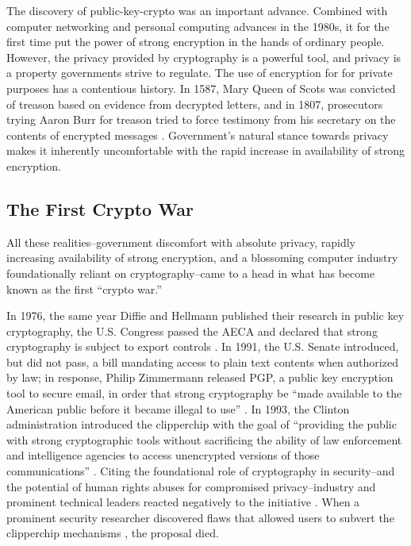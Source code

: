 The discovery of \ac{public-key-crypto} was an important advance. Combined with computer networking and personal
computing advances in the 1980s, it for the first time put the power of strong encryption in the hands of ordinary
people. However, the privacy provided by cryptography is a powerful tool, and privacy is a property governments strive
to regulate. The use of encryption for for private purposes has a contentious history. In 1587, Mary Queen of Scots was
convicted of treason based on evidence from decrypted letters, and in 1807, prosecutors trying Aaron Burr for treason
tried to force testimony from his secretary on the contents of encrypted messages \cite{kerr_encryption_2017}.
Government's natural stance towards privacy makes it inherently uncomfortable with the rapid increase in availability of
strong encryption.


\subsection{The First Crypto War}
\label{sec-history-cw1}

All these realities--government discomfort with absolute privacy, rapidly increasing availability of strong encryption,
and a blossoming computer industry foundationally reliant on cryptography--came to a head in what has become known as
the first ``crypto war.''

In 1976, the same year Diffie and Hellmann published their research in public key cryptography, the U.S. Congress passed
the \ac{AECA} and declared that strong cryptography is subject to export controls \cite{kehl_right_2015}. In 1991, the
U.S. Senate introduced, but did not pass, a bill mandating access to plain text contents when authorized by law; in
response, Philip Zimmermann released \ac{PGP}, a public key encryption tool to secure email, in order that strong
cryptography be ``made available to the American public before it became illegal to use'' \cite{zimmermann_1996}. In
1993, the Clinton administration introduced the \ac{clipperchip} \cite{press_1993} with the goal of ``providing the
public with strong cryptographic tools without sacrificing the ability of law enforcement and intelligence agencies to
access unencrypted versions of those communications'' \cite{thompson_2015}. Citing the foundational role of cryptography
in security--and the potential of human rights abuses for compromised privacy--industry and prominent technical leaders
reacted negatively to the initiative \cite{kehl_right_2015} \cite{zimmermann_1996}. When a prominent security researcher
discovered flaws that allowed users to subvert the \ac{clipperchip} mechanisms \cite{blaze_protocol_1994}, the proposal
died.

